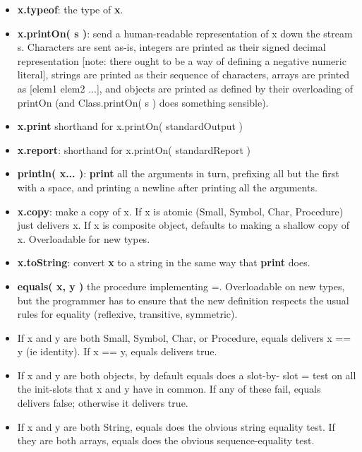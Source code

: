 \documentclass{report}
\begin{document}
\begin{itemize}\item {\bf x.typeof}: the type of {\bf x}.

\item {\bf x.printOn( s )}:
    send a human-readable representation of x down the stream s.
    Characters are sent as-is, integers are printed as their signed
    decimal representation {[}note: there ought to be a way of defining
    a negative numeric literal{]}, strings are printed as their
    sequence of characters, arrays are printed as {[}elem1 elem2 ...{]},
    and objects are printed as defined by their overloading of
    printOn (and Class.printOn( s ) does something sensible).

\item {\bf x.print}
    shorthand for x.printOn( standardOutput )

\item {\bf x.report}:
    shorthand for x.printOn( standardReport )

\item {\bf println( x... )}: {\bf print} all the arguments in turn, prefixing all
but the first with a space, and printing a newline after printing
all the arguments.

\item {\bf x.copy}:
    make a copy of x. If x is atomic (Small, Symbol, Char, Procedure)
    just delivers x. If x is composite object, defaults to making
    a shallow copy of x. Overloadable for new types.

\item {\bf x.toString}:
    convert {\bf x} to a string in the same way that {\bf print} does.

\item {\bf equals( x, y )}
    the procedure implementing =. Overloadable on new types, but
    the programmer has to ensure that the new definition respects
    the usual rules for equality (reflexive, transitive, symmetric).

\item If x and y are both Small, Symbol, Char, or Procedure, equals
    delivers x == y (ie identity). If x == y, equals delivers
    true.

\item If x and y are both objects, by default equals does a slot-by-
    slot = test on all the init-slots that x and y have in common.
    If any of these fail, equals delivers false; otherwise it
    delivers true.

\item If x and y are both String, equals does the obvious string
    equality test. If they are both arrays, equals does the obvious
    sequence-equality test.


\end{itemize}
\end{document}
